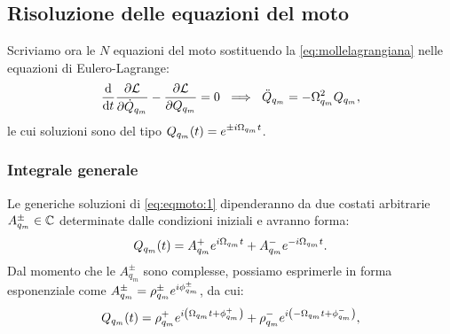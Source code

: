     \subsection{Risoluzione delle equazioni del moto}
        Scriviamo ora le $N$ equazioni del moto sostituendo la \eqref{eq:mollelagrangiana} nelle equazioni di Eulero-Lagrange:
            \begin{equation}
                \lagrange{\LL}{Q_{q_m}}{\dot{Q}_{q_m}}=0\ \implies\ \ddot{Q}_{q_m}=-\Omega_{q_m}^2Q_{q_m},
                \label{eq:eqmoto:1}
            \end{equation}
        le cui soluzioni sono del tipo $\displaystyle Q_{q_m}\qty(t)=e^{\pm i\Omega_{q_m}t}$.
        \subsubsection{Integrale generale}
            Le generiche soluzioni di \eqref{eq:eqmoto:1} dipenderanno da due costati arbitrarie $A_{q_m}^\pm\in\mathbb{C}$ determinate dalle condizioni iniziali e avranno forma:
                $$Q_{q_m}\qty(t)=A_{q_m}^+e^{i\Omega_{q_m}t}+A_{q_m}^-e^{-i\Omega_{q_m}t}.$$
            Dal momento che le $A_{q_m}^\pm$ sono complesse, possiamo esprimerle in forma esponenziale come $A_{q_m}^\pm=\rho_{q_m}^\pm e^{i\phi_{q_m}^\pm}$, da cui:
                $$Q_{q_m}\qty(t)=\rho_{q_m}^+e^{i\qty(\Omega_{q_m}t+\phi_{q_m}^+)}+\rho_{q_m}^-e^{i\qty(-\Omega_{q_m}t+\phi_{q_m}^-)},$$






